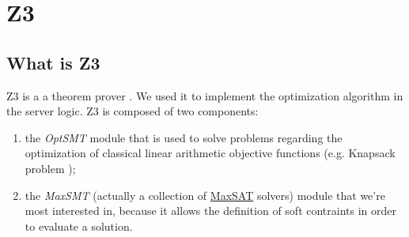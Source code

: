 \section{Z3}\label{Z3}
\subsection{What is Z3}
Z3 is a a theorem prover \cite{z3}. We used it to implement the optimization algorithm in the server logic. Z3 is composed of two components:
\begin{enumerate}
  \item the \textit{OptSMT} module that is used to solve problems regarding the optimization of classical linear arithmetic objective functions (e.g. Knapsack problem \cite{knapsack});
  \item the \textit{MaxSMT} (actually a collection of \underline{MaxSAT} solvers) module that we're most interested in, because it allows the definition of soft contraints in order to evaluate a solution.
\end{enumerate}


